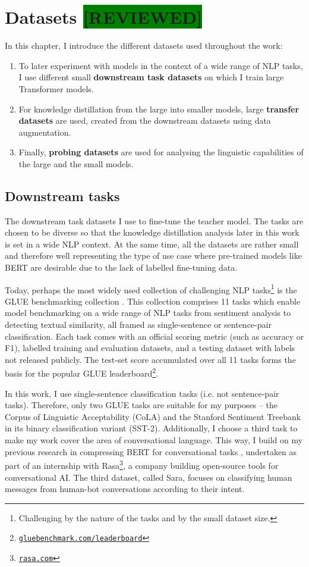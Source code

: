 \documentclass[bsc,frontabs,twoside,singlespacing,parskip,deptreport]{infthesis}
\def\reviewed{\colorbox{green}{[REVIEWED]}}
\newcommand\rurl[1]{%
  \href{https://#1}{\nolinkurl{#1}}%
}
\begin{document}
\chapter{Datasets \reviewed}{
  \label{chap:datasets}

  In this chapter, I introduce the different datasets used throughout the work:
  \begin{enumerate}
    \item To later experiment with models in the context of a wide range of NLP tasks, I use different small \textbf{downstream task datasets} on which I train large Transformer models.
    \item For knowledge distillation from the large into smaller models, large \textbf{transfer datasets} are used, created from the downstream datasets using data augmentation.
    \item Finally, \textbf{probing datasets} are used for analysing the linguistic capabilities of the large and the small models.
  \end{enumerate}

  \section{Downstream tasks}{
    The downstream task datasets I use to fine-tune the teacher model. The tasks are chosen to be diverse so that the knowledge distillation analysis later in this work is set in a wide NLP context. At the same time, all the datasets are rather small and therefore well representing the type of use case where pre-trained models like BERT are desirable due to the lack of labelled fine-tuning data.

    Today, perhaps the most widely used collection of challenging NLP tasks\footnote{Challenging by the nature of the tasks and by the small dataset size.} is the GLUE benchmarking collection \citep{Wang_2018}.
    This collection comprises 11 tasks which enable model benchmarking on a wide range of NLP tasks from sentiment analysis to detecting textual similarity, all framed as single-sentence or sentence-pair classification.
    Each task comes with an official scoring metric (such as accuracy or F1), labelled training and evaluation datasets, and a testing dataset with labels not released publicly.
    The test-set score accumulated over all 11 tasks forms the basis for the popular GLUE leaderboard\footnote{\rurl{gluebenchmark.com/leaderboard}}.
    
    In this work, I use single-sentence classification tasks (i.e. not sentence-pair tasks). Therefore, only two GLUE tasks are suitable for my purposes -- the Corpus of Linguistic Acceptability (CoLA) and the Stanford Sentiment Treebank in its binary classification variant (SST-2). 
    Additionally, I choose a third task to make my work cover the area of conversational language. This way, I build on my previous research in compressing BERT for conversational tasks \citet{Sucik_2019}, undertaken as part of an internship with Rasa\footnote{\rurl{rasa.com}}, a company building open-source tools for conversational AI. The third dataset, called Sara, focuses on classifying human messages from human-bot conversations according to their intent.

}}
\end{document}
